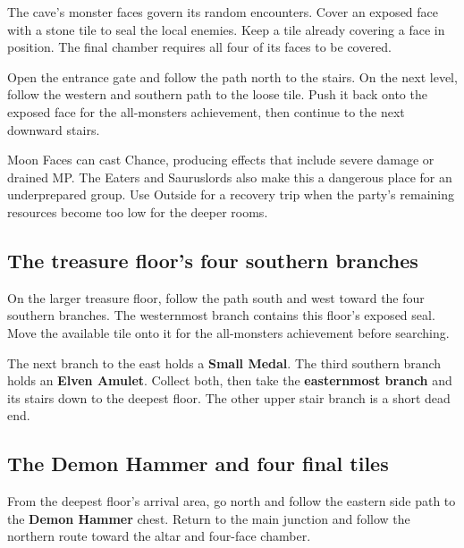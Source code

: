 
The cave's monster faces govern its random encounters.
Cover an exposed face with a stone tile to seal the local
enemies. Keep a tile already covering a face in position.
The final chamber requires all four of its faces to be covered.

Open the entrance gate and follow the path north to the
stairs. On the next level, follow the western and southern
path to the loose tile. Push it back onto the exposed face
for the all-monsters achievement, then continue to the
next downward stairs.

Moon Faces can cast Chance, producing effects that include
severe damage or drained MP. The Eaters and Sauruslords also
make this a dangerous place for an underprepared group.
Use Outside for a recovery trip when the party's remaining
resources become too low for the deeper rooms.

\subsection*{The treasure floor's four southern branches}

On the larger treasure floor, follow the path south and west
toward the four southern branches. The westernmost branch
contains this floor's exposed seal. Move the available tile
onto it for the all-monsters achievement before searching.

The next branch to the east holds a \textbf{Small Medal}.
The third southern branch holds an \textbf{Elven Amulet}.
Collect both, then take the \textbf{easternmost branch}
and its stairs down to the deepest floor. The other upper
stair branch is a short dead end.

\subsection*{The Demon Hammer and four final tiles}

From the deepest floor's arrival area, go north and follow
the eastern side path to the \textbf{Demon Hammer} chest.
Return to the main junction and follow the northern route
toward the altar and four-face chamber.

